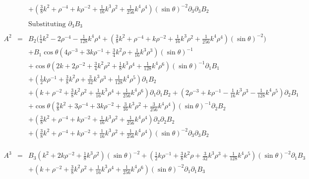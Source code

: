 \documentclass[10pt,letterpaper]{article}
\numberwithin{equation}{section}
\begin{document}
\begin{eqnarray}
&& + (\tfrac{3}{8} k^2 + \rho^{-4} + k \rho^{-2} + \tfrac{1}{16} k^3 \rho^2 + \tfrac{1}{256} k^4 \rho^4) (\sin\theta)^{-2} \partial_{3}\partial_{3}B_{2}
\\ \nonumber\\
&&\text{Substituting $\partial_3 B_3$}
\\ \nonumber\\
A^{2}&=& B_{2} \bigl(\tfrac{1}{4} k^2 - 2 \rho^{-4} -  \tfrac{1}{128} k^4 \rho^4 + (\tfrac{3}{8} k^2 + \rho^{-4} + k \rho^{-2} + \tfrac{1}{16} k^3 \rho^2 + \tfrac{1}{256} k^4 \rho^4) (\sin\theta)^{-2}\bigr) \nonumber \\ 
&& + B_{1} \cos\theta (4 \rho^{-3} + 3 k \rho^{-1} + \tfrac{3}{4} k^2 \rho + \tfrac{1}{16} k^3 \rho^3) (\sin\theta)^{-1} \nonumber \\ 
&& + \cos\theta (2 k + 2 \rho^{-2} + \tfrac{3}{4} k^2 \rho^2 + \tfrac{1}{8} k^3 \rho^4 + \tfrac{1}{128} k^4 \rho^6) (\sin\theta)^{-1} \partial_{1}B_{1} \nonumber \\ 
&& + (\tfrac{1}{2} k \rho^{-1} + \tfrac{3}{8} k^2 \rho + \tfrac{3}{32} k^3 \rho^3 + \tfrac{1}{128} k^4 \rho^5) \partial_{1}B_{2} \nonumber \\ 
&& + (k + \rho^{-2} + \tfrac{3}{8} k^2 \rho^2 + \tfrac{1}{16} k^3 \rho^4 + \tfrac{1}{256} k^4 \rho^6) \partial_{1}\partial_{1}B_{2} + (2 \rho^{-3} + k \rho^{-1} -  \tfrac{1}{16} k^3 \rho^3 -  \tfrac{1}{128} k^4 \rho^5) \partial_{2}B_{1} \nonumber \\ 
&& + \cos\theta (\tfrac{9}{8} k^2 + 3 \rho^{-4} + 3 k \rho^{-2} + \tfrac{3}{16} k^3 \rho^2 + \tfrac{3}{256} k^4 \rho^4) (\sin\theta)^{-1} \partial_{2}B_{2} \nonumber \\ 
&& + (\tfrac{3}{8} k^2 + \rho^{-4} + k \rho^{-2} + \tfrac{1}{16} k^3 \rho^2 + \tfrac{1}{256} k^4 \rho^4) \partial_{2}\partial_{2}B_{2} \nonumber \\ 
&& + (\tfrac{3}{8} k^2 + \rho^{-4} + k \rho^{-2} + \tfrac{1}{16} k^3 \rho^2 + \tfrac{1}{256} k^4 \rho^4) (\sin\theta)^{-2} \partial_{3}\partial_{3}B_{2}
\\ \nonumber\\
\\ \nonumber\\
A^{3}&=& B_{3} (k^2 + 2 k \rho^{-2} + \tfrac{1}{8} k^3 \rho^2) (\sin\theta)^{-2} + (\tfrac{1}{2} k \rho^{-1} + \tfrac{3}{8} k^2 \rho + \tfrac{3}{32} k^3 \rho^3 + \tfrac{1}{128} k^4 \rho^5) (\sin\theta)^{-2} \partial_{1}B_{3} \nonumber \\ 
&& + (k + \rho^{-2} + \tfrac{3}{8} k^2 \rho^2 + \tfrac{1}{16} k^3 \rho^4 + \tfrac{1}{256} k^4 \rho^6) (\sin\theta)^{-2} \partial_{1}\partial_{1}B_{3} \nonumber \\ 

\end{eqnarray}
\end{document}
